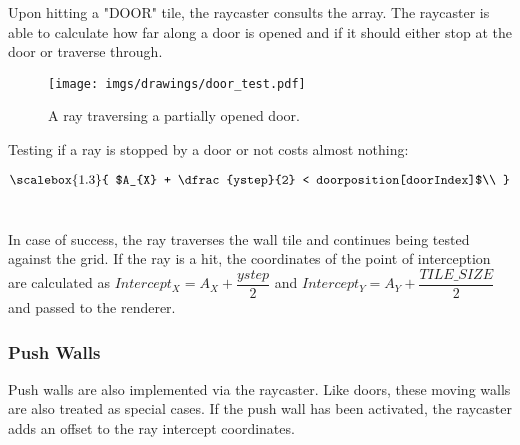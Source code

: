 \par
Upon hitting a "DOOR" tile, the raycaster consults the  array. The raycaster is able to calculate how far along a door is opened and if it should either stop at the door or traverse through.\\

\begin{minipage}{\textwidth}

\end{minipage}

\par 
 \par
\begin{figure}[H]
  \centering
 \texttt{[image: imgs/drawings/door\_test.pdf]}
 \caption{A ray traversing a partially opened door.}
\end{figure}
\par
Testing if a ray is stopped by a door or not costs almost nothing:\\
\par

\begin{equation*}
    \scalebox{1.3}{
$A_{X} + \dfrac{ystep}{2} < doorposition[doorIndex]$\\
}
\end{equation*}\\
\par
 In case of success, the ray traverses the wall tile and continues being tested against the grid. If the ray is a hit, the coordinates of the point of interception are calculated as $Intercept_{X} = A_{X} + \dfrac{ystep}{2}$ and $Intercept_{Y} = A_{Y} + \dfrac{TILE\_SIZE}{2}$ and passed to the renderer.












\subsubsection{Push Walls} 
Push walls are also implemented via the raycaster. Like doors, these moving walls are also treated as special cases. If the push wall has been activated, the raycaster adds an offset to the ray intercept coordinates.


















